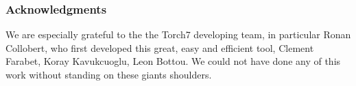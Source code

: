 \documentclass{article} %
\begin{document}
%


\subsubsection*{Acknowledgments}
We are especially grateful to the the Torch7 developing team, in particular Ronan Collobert, who first developed this great, easy and efficient tool, Clement Farabet, Koray Kavukcuoglu, Leon Bottou. We could not have done any of this work without standing on these giants shoulders.



\end{document}
